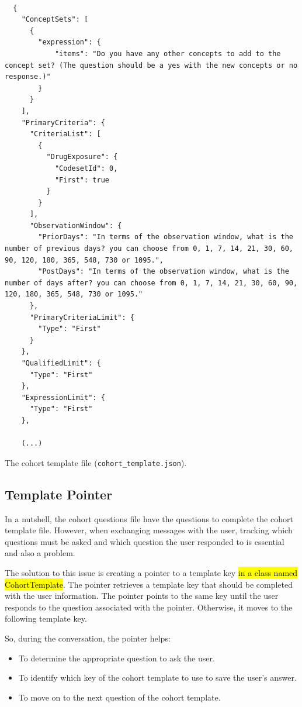 \begin{listing}[H]
  \begin{verbatim}
      
  {
    "ConceptSets": [
      {
        "expression": {
            "items": "Do you have any other concepts to add to the concept set? (The question should be a yes with the new concepts or no response.)"
        }
      }
    ],
    "PrimaryCriteria": {
      "CriteriaList": [
        {
          "DrugExposure": {
            "CodesetId": 0,
            "First": true
          }
        }
      ],
      "ObservationWindow": {
        "PriorDays": "In terms of the observation window, what is the number of previous days? you can choose from 0, 1, 7, 14, 21, 30, 60, 90, 120, 180, 365, 548, 730 or 1095.",
        "PostDays": "In terms of the observation window, what is the number of days after? you can choose from 0, 1, 7, 14, 21, 30, 60, 90, 120, 180, 365, 548, 730 or 1095."
      },
      "PrimaryCriteriaLimit": {
        "Type": "First"
      }
    },
    "QualifiedLimit": {
      "Type": "First"
    },
    "ExpressionLimit": {
      "Type": "First"
    },
    
    (...)
  \end{verbatim}
\caption{The cohort template file {\small\normalfont(\texttt{cohort\_template.json})}.}
\label{template}
\end{listing}  


\subsection{Template Pointer}

In a nutshell, the cohort questions file have the questions to complete the cohort template file. However, when exchanging messages with the user, tracking which questions must be asked and which question the user responded to is essential and also a problem.

The solution to this issue is creating a pointer to a template key \hl{in a class named CohortTemplate}. The pointer retrieves a template key that should be completed with the user information. The pointer points to the same key until the user responds to the question associated with the pointer. Otherwise, it moves to the following template key.

So, during the conversation, the pointer helps:

\begin{itemize}
  \item To determine the appropriate question to ask the user.
  \item To identify which key of the cohort template to use to save the user's answer.
  \item To move on to the next question of the cohort template.
\end{itemize}

